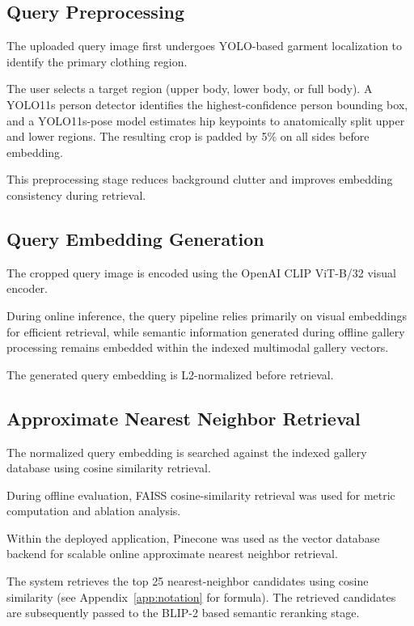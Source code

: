 \documentclass[11pt,a4paper]{article}
\begin{document}
\subsection{Query Preprocessing}

The uploaded query image first undergoes YOLO-based garment localization to identify the primary clothing region.

The user selects a target region (upper body, lower body, or full body). A YOLO11s person detector identifies the highest-confidence person bounding box, and a YOLO11s-pose model estimates hip keypoints to anatomically split upper and lower regions. The resulting crop is padded by 5\% on all sides before embedding.

This preprocessing stage reduces background clutter and improves embedding consistency during retrieval.

\subsection{Query Embedding Generation}

The cropped query image is encoded using the OpenAI CLIP ViT-B/32 visual encoder.

During online inference, the query pipeline relies primarily on visual embeddings for efficient retrieval, while semantic information generated during offline gallery processing remains embedded within the indexed multimodal gallery vectors.

The generated query embedding is L2-normalized before retrieval.

\subsection{Approximate Nearest Neighbor Retrieval}

The normalized query embedding is searched against the indexed gallery database using cosine similarity retrieval.

During offline evaluation, FAISS cosine-similarity retrieval was used for metric computation and ablation analysis.

Within the deployed application, Pinecone was used as the vector database backend for scalable online approximate nearest neighbor retrieval.

The system retrieves the top 25 nearest-neighbor candidates using cosine similarity (see Appendix~\ref{app:notation} for formula). The retrieved candidates are subsequently passed to the BLIP-2 based semantic reranking stage.
\end{document}
